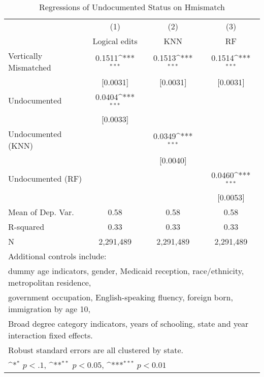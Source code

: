 \begin{table}[htbp]\centering
\def\sym#1{\ifmmode^{#1}\else\(^{#1}\)\fi}
\caption{Regressions of Undocumented Status on Hmismatch}
\begin{tabular}{l*{3}{c}}
\toprule
                    &\multicolumn{1}{c}{(1)}         &\multicolumn{1}{c}{(2)}         &\multicolumn{1}{c}{(3)}         \\
                    &Logical edits         &         KNN         &          RF         \\
\midrule
Vertically Mismatched&      0.1511\sym{***}&      0.1513\sym{***}&      0.1514\sym{***}\\
                    &    [0.0031]         &    [0.0031]         &    [0.0031]         \\
\addlinespace
Undocumented        &      0.0404\sym{***}&                     &                     \\
                    &    [0.0033]         &                     &                     \\
\addlinespace
Undocumented (KNN)  &                     &      0.0349\sym{***}&                     \\
                    &                     &    [0.0040]         &                     \\
\addlinespace
Undocumented (RF)   &                     &                     &      0.0460\sym{***}\\
                    &                     &                     &    [0.0053]         \\
\midrule
Mean of Dep. Var.   &        0.58         &        0.58         &        0.58         \\
R-squared           &        0.33         &        0.33         &        0.33         \\
N                   &   2,291,489         &   2,291,489         &   2,291,489         \\
\bottomrule
\multicolumn{4}{l}{\footnotesize Additional controls include:}\\
\multicolumn{4}{l}{\footnotesize dummy age indicators, gender, Medicaid reception, race/ethnicity, metropolitan residence,}\\
\multicolumn{4}{l}{\footnotesize government occupation, English-speaking fluency, foreign born, immigration by age 10,}\\
\multicolumn{4}{l}{\footnotesize Broad degree category indicators, years of schooling, state and year interaction fixed effects.}\\
\multicolumn{4}{l}{\footnotesize Robust standard errors are all clustered by state.}\\
\multicolumn{4}{l}{\footnotesize \sym{*} \(p<.1\), \sym{**} \(p<0.05\), \sym{***} \(p<0.01\)}\\
\end{tabular}
\end{table}
